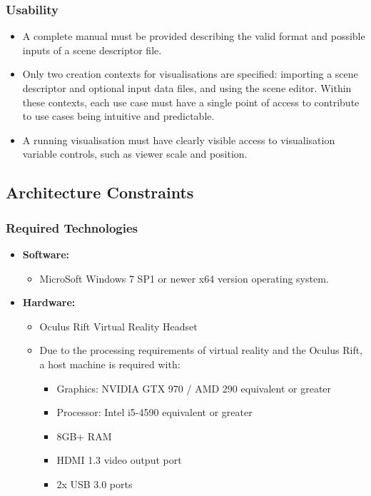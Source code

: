 \documentclass[a4paper,12pt]{article}
\begin{document}
	\subsubsection{Usability}
	
		\begin{itemize}
			\item  A complete manual must be provided describing the valid format and possible inputs of a scene descriptor file.
			\item Only two creation contexts for visualisations are specified: importing a scene descriptor and optional input data files, and using the scene editor. Within these contexts, each use case must have a single point of access to contribute to use cases being intuitive and predictable.
			\item A running visualisation must have clearly visible access to visualisation variable controls, such as viewer scale and position. 
		\end{itemize}

\subsection{Architecture Constraints}

	\subsubsection{Required Technologies}
		
		\begin{itemize}
			\item \textbf{Software:}
				\begin{itemize}
					\item MicroSoft Windows 7 SP1 or newer x64 version operating system.
				\end{itemize}
			\item \textbf{Hardware:}
				\begin{itemize}
					\item Oculus Rift Virtual Reality Headset
					\item Due to the processing requirements of virtual reality and the Oculus Rift, a host machine is required with:
						\begin{itemize}
							\item Graphics: NVIDIA GTX 970 / AMD 290 equivalent or greater
							\item Processor: Intel i5-4590 equivalent or greater
							\item 8GB+ RAM
							\item HDMI 1.3 video output port
							\item 2x USB 3.0 ports
						\end{itemize}
				\end{itemize}
		\end{itemize}
\end{document}
